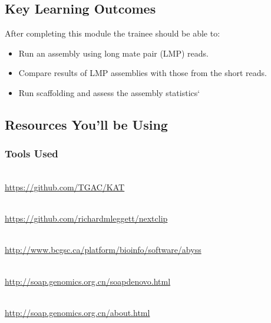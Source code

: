 

\chapter{\moduleTitle}
\newpage

\section{Key Learning Outcomes}

After completing this module the trainee should be able to:
\begin{itemize}
  \item Run an assembly using long mate pair (LMP) reads. 
  \item Compare results of LMP assemblies with those from the short reads.
  \item Run scaffolding and assess the assembly statistics`
\end{itemize}

\section{Resources You'll be Using}
 
\subsection{Tools Used}
\begin{description}[style=multiline,labelindent=0cm,align=left,leftmargin=0.5cm]
  \item[Kmer Analysis Tool kit]\hfill\\
  	\url{https://github.com/TGAC/KAT}
  \item[Nextclip]\hfill\\
  	\url{https://github.com/richardmleggett/nextclip}
  \item[Abyss]\hfill\\
  	\url{http://www.bcgsc.ca/platform/bioinfo/software/abyss}
  \item[Soap Denovo]\hfill\\
  	\url{http://soap.genomics.org.cn/soapdenovo.html}
  \item[SOAPec]\hfill\\
  	\url{http://soap.genomics.org.cn/about.html}
\end{description}



